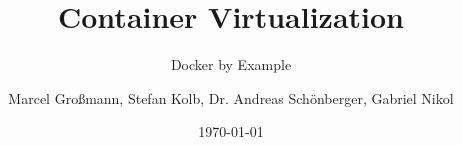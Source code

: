 \author[Initials]{Marcel Gro\ss{}mann, Stefan Kolb, Dr. Andreas Sch\"onberger, Gabriel Nikol}
\title{Container Virtualization}
\subtitle{Docker by Example}
\date{\today}

\subject{Docker by Example}

\institute[]{\chair\\ \chairsub}


\gittrue
\presentationtrue

